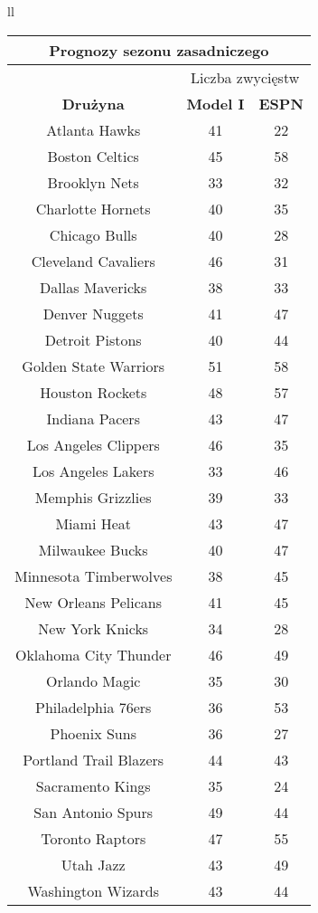 \documentclass[inzynierska]{pwr_wmat_praca_dyplomowa}
\theoremstyle{plain}
\numberwithin{theorem}{chapter}
\theoremstyle{definition}
\numberwithin{theorem}{chapter}
\begin{document}
\begin{table}[]
	\centering
	\begin{tabular}{ll}
	\begin{tabular}{|c|c|c|}
		\hline
		\multicolumn{3}{|c|}{\textbf{Prognozy sezonu zasadniczego}} \\\hline
		&\multicolumn{2}{|c|}{Liczba zwycięstw} \\\hline	
		\textbf{Drużyna}      & \textbf{Model I} & \textbf{ESPN}\\ \hline
		Atlanta Hawks & 41 & 22\\ \hline
		Boston Celtics & 45 & 58\\ \hline
		Brooklyn Nets & 33 & 32\\ \hline
		Charlotte Hornets & 40 & 35\\ \hline
		Chicago Bulls & 40 & 28\\ \hline	
		Cleveland Cavaliers & 46 & 31\\ \hline
		Dallas Mavericks & 38& 33\\ \hline	
		Denver Nuggets & 41 & 47\\ \hline
		Detroit Pistons & 40 & 44\\ \hline
		Golden State Warriors & 51 & 58\\ \hline
		Houston Rockets & 48 & 57\\\hline
		Indiana Pacers & 43 & 47\\\hline
		Los Angeles Clippers & 46 &35\\ \hline
		Los Angeles Lakers & 33 & 46\\ \hline
		Memphis Grizzlies & 39 &33\\ \hline
		Miami Heat & 43 & 47 \\\hline
		Milwaukee Bucks & 40 & 47\\ \hline
		Minnesota Timberwolves & 38 & 45\\ \hline
		New Orleans Pelicans & 41  &45\\ \hline
		New York Knicks & 34 & 28\\ \hline
		Oklahoma City Thunder & 46 & 49\\ \hline
		Orlando Magic & 35 & 30\\ \hline
		Philadelphia 76ers & 36 & 53\\ \hline
		Phoenix Suns & 36 &27\\\hline
		Portland Trail Blazers & 44& 43\\ \hline	
		Sacramento Kings & 35 &24\\ \hline
		San Antonio Spurs & 49 &44\\ \hline
		Toronto Raptors & 47 & 55\\ \hline
		Utah Jazz & 43 & 49\\\hline
		Washington Wizards & 43 & 44\\ \hline
	\end{tabular}


\end{tabular}
\end{table}
\end{document}

